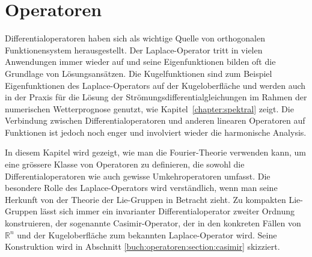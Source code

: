 %
%
%
\chapter{Operatoren
\label{buch:chapter:operatoren}}
Differentialoperatoren haben sich als wichtige Quelle von orthogonalen
Funktionensystem herausgestellt.
Der Laplace-Operator tritt in vielen Anwendungen immer wieder auf
und seine Eigenfunktionen bilden oft die Grundlage von Lösungsansätzen.
Die Kugelfunktionen sind zum Beispiel Eigenfunktionen des Laplace-Operators
auf der Kugeloberfläche und werden auch in der Praxis für die Lösung der
Strömungsdifferentialgleichungen im Rahmen der numerischen Wetterprognose 
genutzt, wie Kapitel~\ref{chapter:spektral} zeigt.
Die Verbindung zwischen Differentialoperatoren und anderen linearen
Operatoren auf Funktionen ist jedoch noch enger und involviert wieder
die harmonische Analysis.

In diesem Kapitel wird gezeigt, wie man die Fourier-Theorie verwenden
kann, um eine grössere Klasse von Operatoren zu definieren, die sowohl
die Differentialoperatoren wie auch gewisse Umkehroperatoren umfasst.
Die besondere Rolle des Laplace-Operators wird verständlich, wenn man
seine Herkunft von der Theorie der Lie-Gruppen in Betracht zieht.
Zu kompakten Lie-Gruppen lässt sich immer ein invarianter
Differentialoperator zweiter Ordnung konstruieren, der sogenannte
Casimir-Operator, der in den konkreten Fällen von $\mathbb{R}^n$
und der Kugeloberfläche zum bekannten Laplace-Operator wird.
Seine Konstruktion wird in Abschnitt \ref{buch:operatoren:section:casimir}
skizziert.




